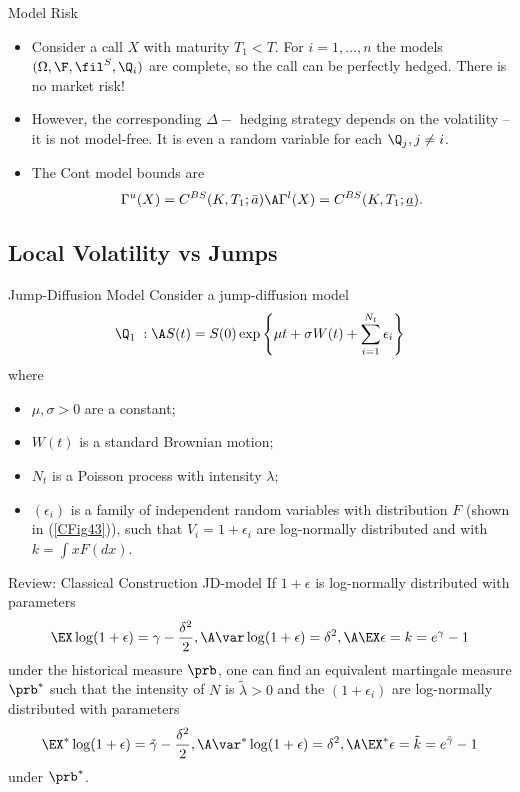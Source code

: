 {Model Risk}
\begin{itemize}
\item<1-> Consider a call $X$ with maturity $T_1 <T$. For $i=1, \ldots, n$ the models
$(\Omega, \F, \fil^S, \Q_i)$ are complete, so the call can be perfectly hedged. There is no market risk!
\item<2->
However, the corresponding $\Delta-$ hedging strategy depends on the volatility -- it is not model-free. It is even a random variable for each $\Q_j, j \not = i$.
\item<3->
The Cont model bounds are
$$
\Gamma^u(X)=C^{BS}(K, T_1; \bar{a})  \A \Gamma^l(X)=C^{BS}(K, T_1; \underline{a}).$$

\end{itemize}

\subsection{Local Volatility vs Jumps}

{Jump-Diffusion Model}
Consider a jump-diffusion model
\begin{equation}\label{jump-diffusion-model}
\Q_1\; : \A S(t)=S(0) \exp\left\{\mu t + \sigma  W(t) + \sum_{i=1}^{N_t} \epsilon_i\right\}
\end{equation}
where
\begin{itemize}
\item $\mu, \sigma>0$ are a constant;
\item $W(t)$ is a standard Brownian motion;
\item $N_t$ is a Poisson process with intensity $\lambda$;
\item $(\epsilon_i)$ is a family of independent random variables with distribution $F$
(shown in (\ref{CFig43})), such that
$V_i= 1+\epsilon_i$ are log-normally distributed and
with $k = \int x F(dx)$.
\end{itemize}

{Review: Classical Construction JD-model}
If $1+\epsilon$ is log-normally distributed  with parameters
$$
\EX\log(1+\epsilon)= \gamma-\frac{\delta^2}{2},\A
\var\log(1+\epsilon)=\delta^2, \A \EX\epsilon=k=e^\gamma-1
$$
under the historical measure $\prb$, one can find an equivalent
martingale measure $\prb^*$ such that the intensity of $N$ is
$\tilde{\lambda}>0$ and the $(1+\epsilon_i)$ are log-normally
distributed with parameters
$$
\EX^*\log(1+\epsilon)= \tilde{\gamma}-\frac{\delta^2}{2},\A
\var^*\log(1+\epsilon)=\delta^2, \A
\EX^*\epsilon=\tilde{k}=e^{\tilde{\gamma}}-1
$$
under $\prb^*$.

